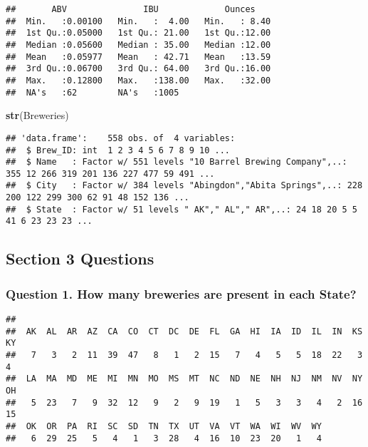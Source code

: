 \documentclass[]{article}
\newenvironment{Shaded}{\begin{snugshade}}{\end{snugshade}}
\newcommand{\KeywordTok}[1]{\textcolor[rgb]{0.13,0.29,0.53}{\textbf{{#1}}}}
\newcommand{\DataTypeTok}[1]{\textcolor[rgb]{0.13,0.29,0.53}{{#1}}}
\newcommand{\StringTok}[1]{\textcolor[rgb]{0.31,0.60,0.02}{{#1}}}
\newcommand{\NormalTok}[1]{{#1}}
\begin{document}
\begin{verbatim}
##       ABV               IBU             Ounces     
##  Min.   :0.00100   Min.   :  4.00   Min.   : 8.40  
##  1st Qu.:0.05000   1st Qu.: 21.00   1st Qu.:12.00  
##  Median :0.05600   Median : 35.00   Median :12.00  
##  Mean   :0.05977   Mean   : 42.71   Mean   :13.59  
##  3rd Qu.:0.06700   3rd Qu.: 64.00   3rd Qu.:16.00  
##  Max.   :0.12800   Max.   :138.00   Max.   :32.00  
##  NA's   :62        NA's   :1005
\end{verbatim}

\begin{Shaded}
\begin{Highlighting}[]
\KeywordTok{str}\NormalTok{(Breweries)}
\end{Highlighting}
\end{Shaded}

\begin{verbatim}
## 'data.frame':    558 obs. of  4 variables:
##  $ Brew_ID: int  1 2 3 4 5 6 7 8 9 10 ...
##  $ Name   : Factor w/ 551 levels "10 Barrel Brewing Company",..: 355 12 266 319 201 136 227 477 59 491 ...
##  $ City   : Factor w/ 384 levels "Abingdon","Abita Springs",..: 228 200 122 299 300 62 91 48 152 136 ...
##  $ State  : Factor w/ 51 levels " AK"," AL"," AR",..: 24 18 20 5 5 41 6 23 23 23 ...
\end{verbatim}

\subsection{\texorpdfstring{\textbf{Section 3}
Questions}{Section 3 Questions}}\label{section-3-questions}

\subsubsection{Question 1. How many breweries are present in each
State?}\label{question-1.-how-many-breweries-are-present-in-each-state}

\begin{Shaded}
\end{Shaded}

\begin{verbatim}
## 
##  AK  AL  AR  AZ  CA  CO  CT  DC  DE  FL  GA  HI  IA  ID  IL  IN  KS  KY 
##   7   3   2  11  39  47   8   1   2  15   7   4   5   5  18  22   3   4 
##  LA  MA  MD  ME  MI  MN  MO  MS  MT  NC  ND  NE  NH  NJ  NM  NV  NY  OH 
##   5  23   7   9  32  12   9   2   9  19   1   5   3   3   4   2  16  15 
##  OK  OR  PA  RI  SC  SD  TN  TX  UT  VA  VT  WA  WI  WV  WY 
##   6  29  25   5   4   1   3  28   4  16  10  23  20   1   4
\end{verbatim}
\end{document}
